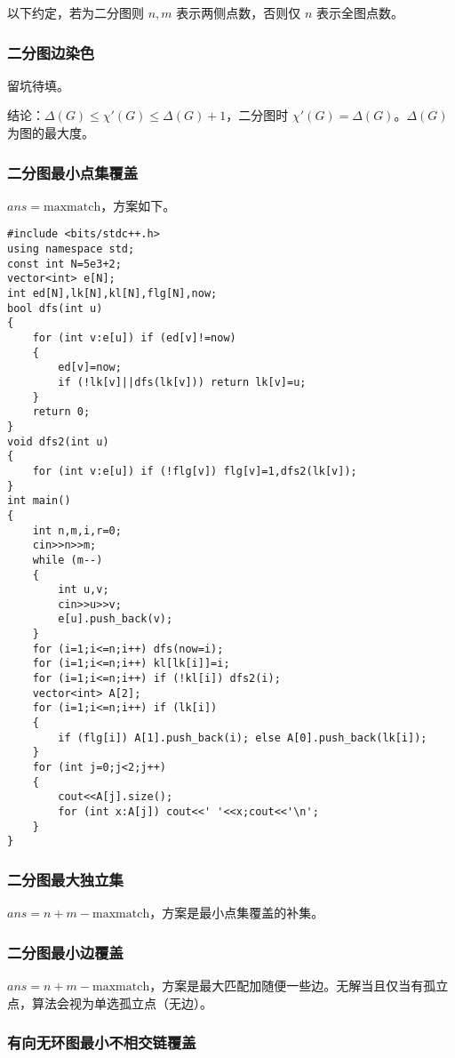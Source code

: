 \documentclass[12pt]{ctexart}
\begin{document}
以下约定，若为二分图则 $n,m$ 表示两侧点数，否则仅 $n$ 表示全图点数。

\subsubsection{二分图边染色}

留坑待填。

结论：$\Delta(G)\le \chi'(G) \le \Delta(G)+1$，二分图时 $\chi'(G)=\Delta(G)$。$\Delta(G)$ 为图的最大度。

\subsubsection{二分图最小点集覆盖}

$ans=\text{maxmatch}$，方案如下。

\begin{lstlisting}
#include <bits/stdc++.h>
using namespace std;
const int N=5e3+2;
vector<int> e[N];
int ed[N],lk[N],kl[N],flg[N],now;
bool dfs(int u)
{
	for (int v:e[u]) if (ed[v]!=now)
	{
		ed[v]=now;
		if (!lk[v]||dfs(lk[v])) return lk[v]=u;
	}
	return 0;
}
void dfs2(int u)
{
	for (int v:e[u]) if (!flg[v]) flg[v]=1,dfs2(lk[v]);
}
int main()
{
	int n,m,i,r=0;
	cin>>n>>m;
	while (m--)
	{
		int u,v;
		cin>>u>>v;
		e[u].push_back(v);
	}
	for (i=1;i<=n;i++) dfs(now=i);
	for (i=1;i<=n;i++) kl[lk[i]]=i;
	for (i=1;i<=n;i++) if (!kl[i]) dfs2(i);
	vector<int> A[2];
	for (i=1;i<=n;i++) if (lk[i])
	{
		if (flg[i]) A[1].push_back(i); else A[0].push_back(lk[i]);
	}
	for (int j=0;j<2;j++)
	{
		cout<<A[j].size();
		for (int x:A[j]) cout<<' '<<x;cout<<'\n';
	}
}
\end{lstlisting}

\subsubsection{二分图最大独立集}

$ans=n+m-\text{maxmatch}$，方案是最小点集覆盖的补集。

\subsubsection{二分图最小边覆盖}

$ans=n+m-\text{maxmatch}$，方案是最大匹配加随便一些边。无解当且仅当有孤立点，算法会视为单选孤立点（无边）。

\subsubsection{有向无环图最小不相交链覆盖}
\end{document}
